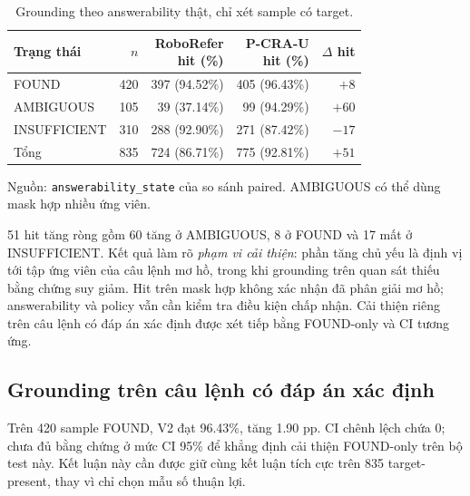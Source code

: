 \begin{table}[htbp]
    \centering
    \setlength{\tabcolsep}{4pt}
    \renewcommand{\arraystretch}{1.15}
    \caption{Grounding theo answerability thật,
    chỉ xét sample có target.}
    \label{tab:results-grounding-by-state}
    \small
    \begin{tabularx}{\textwidth}{@{}>{\raggedright\arraybackslash}Xrrrr@{}}
        \toprule
        Trạng thái & $n$ & \shortstack{RoboRefer\\hit (\%)} & \shortstack{P-CRA-U\\hit (\%)} & $\Delta$ hit \\
        \midrule
        FOUND & 420 & 397 (94.52\%) & 405 (96.43\%) & $+8$ \\
        AMBIGUOUS & 105 & 39 (37.14\%) & 99 (94.29\%) & $+60$ \\
        INSUFFICIENT & 310 & 288 (92.90\%) & 271 (87.42\%) & $-17$ \\
        \midrule
        Tổng & 835 & 724 (86.71\%) & 775 (92.81\%) & $+51$ \\
        \bottomrule
    \end{tabularx}
    \vspace{2pt}
    {\footnotesize\raggedright Nguồn: \texttt{answerability\_\allowbreak state}
    của so sánh paired. AMBIGUOUS có thể dùng
    mask hợp nhiều ứng viên.\par}
\end{table}

51 hit tăng ròng gồm 60 tăng ở AMBIGUOUS, 8 ở FOUND và 17 mất
ở INSUFFICIENT. Kết quả làm rõ \emph{phạm vi cải thiện}: phần tăng
chủ yếu là định vị tới tập ứng viên của câu lệnh mơ hồ, trong khi
grounding trên quan sát thiếu bằng chứng suy giảm. Hit trên mask hợp
không xác nhận đã phân giải mơ hồ; answerability và policy vẫn cần
kiểm tra điều kiện chấp nhận. Cải thiện riêng trên câu lệnh có đáp án
xác định được xét tiếp bằng FOUND-only và CI tương ứng.

\subsection{Grounding trên câu lệnh có đáp án xác định}

Trên 420 sample FOUND, V2 đạt 96.43\%, tăng 1.90 pp.
CI chênh lệch chứa 0; chưa đủ bằng chứng ở mức CI 95\%
để khẳng định cải thiện FOUND-only trên bộ test này.
Kết luận này cần được giữ cùng kết luận tích cực trên
835 target-present, thay vì chỉ chọn mẫu số thuận lợi.

